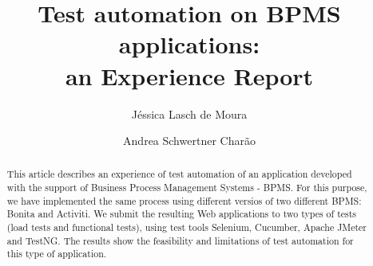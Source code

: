 \documentclass[runningheads,a4paper]{llncs}
\newcommand{\keywords}[1]{\par\addvspace\baselineskip
\noindent\keywordname\enspace\ignorespaces#1}
\begin{document}
\mainmatter  %

\title{
Test automation on BPMS applications: \\ an Experience Report}


%
%
\author{Jéssica Lasch de Moura
\and Andrea Schwertner Charão}
%


%
%

\maketitle


\begin{abstract}
This article describes an experience of test automation of an application developed with the support of Business Process Management Systems - BPMS. For this purpose, we have implemented the same process using different versios of two different BPMS: Bonita and Activiti. We submit the resulting Web applications to two types of tests (load tests and functional tests), using test tools Selenium, Cucumber, Apache JMeter and TestNG. The results show the feasibility and limitations of test automation for this type of application.

\end{abstract}
\end{document}
